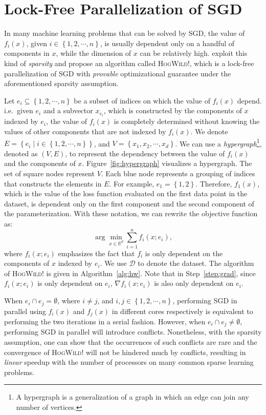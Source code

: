 \documentclass[12pt]{report}
\newcommand{\grad}{\nabla}
\newcommand{\curly}[1]{\left\{#1\right\}}
\begin{document}
\section{Lock-Free Parallelization of SGD}
In many machine learning problems that can be solved by SGD, the value of $f_i(x)$, given $i \in \curly{1,2,\cdots,n}$, is usually dependent only on a handful of components in $x$, while the dimension of $x$ can be relatively high. \cite{recht2011hogwild} exploit this kind of \emph{sparsity} and propose an algorithm called 
\textsc{HogWild!}, which is a lock-free parallelization of SGD with \emph{provable} optimizational guarantee under the aforementioned sparsity assumption.

Let $e_i\subseteq \curly{1,2,\cdots,n}$ be a subset of indices on which the value of $f_i(x)$ depend. i.e.~given $e_i$ and a subvector $x_{e_i}$, which is constructed by the components of $x$ indexed by $e_i$, the value of $f_i(x)$ is completely determined  without knowing the values of other components that are not indexed by $f_i(x)$. We denote $E = \curly{e_i \mid i\in \curly{1,2,\cdots,n}}$, and $V = \curly{x_1,x_2,\cdots,x_d}$. We can use a \emph{hypergraph}\footnote{A hypergraph is a generalization of a graph in which an edge can join any number of vertices.}, denoted as $(V,E)$, to represent the dependency between the value of $f_i(x)$ and the components of $x$. Figure~\ref{fig:hypergraph} visualizes a hypergraph. The set of square nodes represent $V$. Each blue node represents a grouping of indices that constructs the elements in $E$. For example, $e_1 = \curly{1,2}$. Therefore, $f_1(x)$, which is the value of the loss function evaluated on the first data point in the dataset, is dependent only on the first component and the second component of the parameterization. With these notation, we can rewrite the objective function as:
\begin{equation*}
\arg\min_{x\in\mathbb{R}^d} \sum_{i=1}^n f_i(x;e_i),
\end{equation*}
where $f_i(x;e_i)$ emphasizes the fact that $f_i$ is only dependent on the components of $x$ indexed by $e_i$. We use $\mathcal{D}$ to denote the dataset. The algorithm of \textsc{HogWild!} is given in Algorithm~\ref{alg:hw}. Note that in Step~\ref{step:grad}, since $f_i(x;e_i)$ is only dependent on $e_i$, $\grad f_i(x;e_i)$ is also only dependent on $e_i$. 

When $e_i \cap e_j = \emptyset$, where $i\ne j$, and $i,j\in \curly{1,2,\cdots,n}$, performing SGD in parallel using $f_i(x)$ and $f_j(x)$ in different cores respectively is equivalent to performing the two iterations in a serial fashion. However, when $e_i \cap e_j \ne \emptyset$, performing SGD in parallel will introduce conflicts. Nonetheless, with the sparsity assumption, one can show that the occurrences of such conflicts are rare and the convergence of \textsc{HogWild!} will not be hindered much by conflicts, resulting in \emph{linear} speedup with the number of processors on many common sparse learning problems. 
\end{document}
